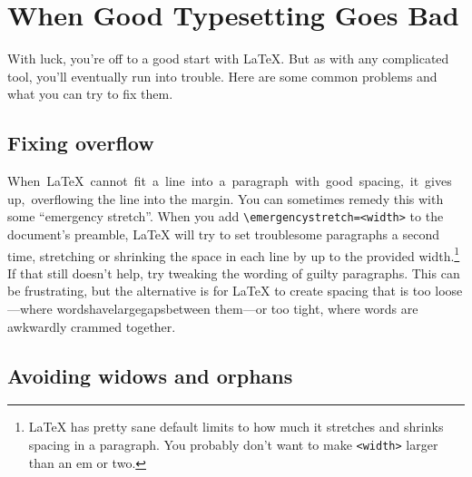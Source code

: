 \chapter{When Good Typesetting Goes Bad}

With luck, you're off to a good start with \LaTeX.
But as with any complicated tool, you'll eventually run into trouble.
Here are some common problems and what you can try to fix them.

\section{Fixing overflow}

\mbox{When \LaTeX{} cannot fit a line into a paragraph with good spacing,
it gives up, overflowing} the line into the margin.
You can sometimes remedy this with some ``emergency stretch''\quotekern.
When you add \texttt{\textbackslash emergencystretch=\allowbreak<width>}
to the document's preamble,
\LaTeX{} will try to set troublesome paragraphs a second time,
stretching or shrinking the space in each line by up to the provided
width.\punckern\footnote{\LaTeX{} has pretty sane default limits to how much
it stretches and shrinks spacing in a paragraph.
You probably don't want to make \texttt{<width>} larger than an em or two.}
If that still doesn't help, try tweaking the wording of guilty paragraphs.
This can be frustrating, but the alternative is for \LaTeX{} to create spacing
that is too loose---where\quad
words\quad have\quad large\quad gaps\quad between\quad
them---or too tight, where\! words\! are\! awkwardly\! crammed\! together.

\section{Avoiding widows and orphans}

